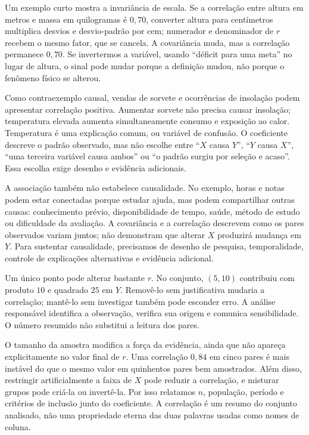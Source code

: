 Um exemplo curto mostra a invariância de escala. Se a correlação entre altura em metros e massa em quilogramas é $0{,}70$, converter altura para centímetros multiplica desvios e desvio-padrão por cem; numerador e denominador de $r$ recebem o mesmo fator, que se cancela. A covariância muda, mas a correlação permanece $0{,}70$. Se invertermos a variável, usando ``déficit para uma meta'' no lugar de altura, o sinal pode mudar porque a definição mudou, não porque o fenômeno físico se alterou.

Como contraexemplo causal, vendas de sorvete e ocorrências de insolação podem apresentar correlação positiva. Aumentar sorvete não precisa causar insolação; temperatura elevada aumenta simultaneamente consumo e exposição ao calor. Temperatura é uma explicação comum, ou variável de confusão. O coeficiente descreve o padrão observado, mas não escolhe entre ``$X$ causa $Y$'', ``$Y$ causa $X$'', ``uma terceira variável causa ambos'' ou ``o padrão surgiu por seleção e acaso''. Essa escolha exige desenho e evidência adicionais.

A associação também não estabelece causalidade. No exemplo, horas e notas podem estar conectadas porque estudar ajuda, mas podem compartilhar outras causas: conhecimento prévio, disponibilidade de tempo, saúde, método de estudo ou dificuldade da avaliação. A covariância e a correlação descrevem como os pares observados variam juntos; não demonstram que alterar $X$ produzirá mudança em $Y$. Para sustentar causalidade, precisamos de desenho de pesquisa, temporalidade, controle de explicações alternativas e evidência adicional.

Um único ponto pode alterar bastante $r$. No conjunto, $(5,10)$ contribuiu com produto $10$ e quadrado $25$ em $Y$. Removê-lo sem justificativa mudaria a correlação; mantê-lo sem investigar também pode esconder erro. A análise responsável identifica a observação, verifica sua origem e comunica sensibilidade. O número resumido não substitui a leitura dos pares.

O tamanho da amostra modifica a força da evidência, ainda que não apareça explicitamente no valor final de $r$. Uma correlação $0{,}84$ em cinco pares é mais instável do que o mesmo valor em quinhentos pares bem amostrados. Além disso, restringir artificialmente a faixa de $X$ pode reduzir a correlação, e misturar grupos pode criá-la ou invertê-la. Por isso relatamos $n$, população, período e critérios de inclusão junto do coeficiente. A correlação é um resumo do conjunto analisado, não uma propriedade eterna das duas palavras usadas como nomes de coluna.

